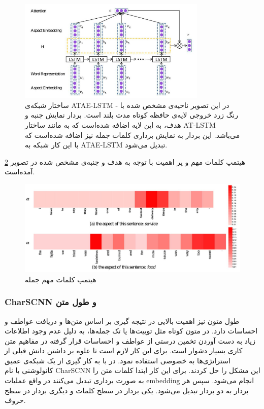 \documentclass[12pt, a4paper, oneside]{report}
\begin{document}
\begin{figure}[h]
    \centering
    \includegraphics[width=0.8\textwidth]{ATAE-LSTM}
    \caption{ ساختار شبکه‌ی 
        ATAE-LSTM -
        در این تصویر ناحیه‌ی مشخص شده با رنگ زرد خروجی لایه‌ی حافظه کوتاه مدت بلند است.
        بردار نمایش جنبه و هدف، به این لایه اضافه شده‌است که به مانند ساختار
        AT-LSTM
        می‌باشد. این بردار به نمایش برداری کلمات جمله نیز اضافه شده‌است که با این کار شبکه به
        ATAE-LSTM
        تبدیل می‌شود.
    }
    \label{fig:ATAE-LSTM}
\end{figure}

هیتمپ کلمات مهم و پر اهمیت با توجه به هدف و جنبه‌ی مشخص شده در تصویر
\ref{fig:ATAE-HM}
آمده‌است.

\begin{figure}[h]
    \centering
    \includegraphics[width=1\textwidth]{ATAE-HM}
    \caption{ هیتمپ کلمات مهم جمله }
    \label{fig:ATAE-HM}
\end{figure}

\subsubsection{CharSCNN و طول متن}

طول متون نیز اهمیت بالایی در نتیجه گیری بر اساس متن‌ها و دریافت عواطف و احساسات دارد.
در متون کوتاه مثل توییت‌ها یا تک جمله‌ها، به دلیل عدم وجود اطلاعات زیاد به دست آوردن تخمین درستی از
عواطف و احساسات قرار گرفته در مفاهیم متن کاری بسیار دشوار است.
برای این کار لازم است تا علوه بر داشتن دانش قبلی از استراتژی‌ها به خصوصی استفاده نمود.
در
\cite{dos2014deep}
با به کار گیری از یک شبکه‌ی عمیق کانولوشنی با نام
CharSCNN
این مشکل را حل کردند. برای این کار ابتدا کلمات متن را به صورت برداری تبدیل می‌کنند در واقع عملیات
embedding
انجام می‌شود. سپس هر بردار به دو بردار تبدیل می‌شود. یکی بردار در سطح کلمات و دیگری بردار در سطح حروف.
\end{document}
